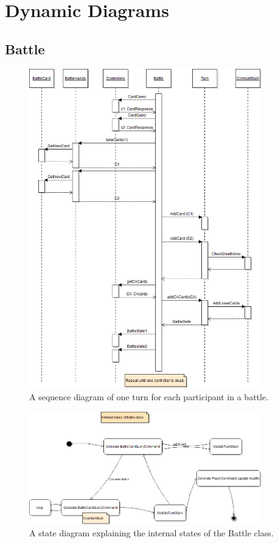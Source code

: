 \section{Dynamic Diagrams}
\label{sec:dynamics}
\subsection{Battle}
\begin{figure}[h]
\center
\includegraphics[width=0.9\textwidth]{diagrams/BattleSequenceDiagram.png}
\caption{A sequence diagram of one turn for each participant in a battle.}
\label{fig:battle_sequence_diagram}
\end{figure}

\begin{figure}[h]
\center
\includegraphics[width=0.9\textwidth]{diagrams/BattleStateDiagram.png}
\caption{A state diagram explaining the internal states of the Battle class.}
\label{fig:battle_state_diagram}
\end{figure}


